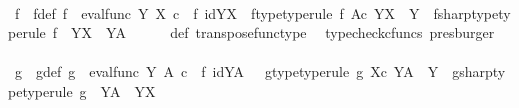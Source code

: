\begin{isabellebody}
\ \ \isamarkupfalse%
\ f\ \ f{\isacharunderscore}{\kern0pt}def{\isacharcolon}{\kern0pt}\ {\isachardoublequoteopen}f\ {\isacharequal}{\kern0pt}\ {\isacharparenleft}{\kern0pt}eval{\isacharunderscore}{\kern0pt}func\ Y\ X{\isacharparenright}{\kern0pt}\ {\isasymcirc}\isactrlsub c\ {\isacharparenleft}{\kern0pt}{\isasympsi}\ {\isasymtimes}\isactrlsub f\ id{\isacharparenleft}{\kern0pt}Y\isactrlbsup X\isactrlesup {\isacharparenright}{\kern0pt}{\isacharparenright}{\kern0pt}{\isachardoublequoteclose}\ \ f{\isacharunderscore}{\kern0pt}type{\isacharbrackleft}{\kern0pt}type{\isacharunderscore}{\kern0pt}rule{\isacharbrackright}{\kern0pt}{\isacharcolon}{\kern0pt}\ {\isachardoublequoteopen}f{\isacharcolon}{\kern0pt}\ A{\isasymtimes}\isactrlsub c\ {\isacharparenleft}{\kern0pt}Y\isactrlbsup X\isactrlesup {\isacharparenright}{\kern0pt}\ {\isasymrightarrow}\ Y{\isachardoublequoteclose}\ \ fsharp{\isacharunderscore}{\kern0pt}type{\isacharbrackleft}{\kern0pt}type{\isacharunderscore}{\kern0pt}rule{\isacharbrackright}{\kern0pt}{\isacharcolon}{\kern0pt}\ {\isachardoublequoteopen}f\isactrlsup {\isasymsharp}\ {\isacharcolon}{\kern0pt}\ Y\isactrlbsup X\isactrlesup \ {\isasymrightarrow}\ Y\isactrlbsup A\isactrlesup {\isachardoublequoteclose}\isanewline
\ \ \ \ \isamarkupfalse%
\ {\isasympsi}{\isacharunderscore}{\kern0pt}def\ transpose{\isacharunderscore}{\kern0pt}func{\isacharunderscore}{\kern0pt}type\ \isamarkupfalse%
\ {\isacharparenleft}{\kern0pt}typecheck{\isacharunderscore}{\kern0pt}cfuncs{\isacharcomma}{\kern0pt}\ presburger{\isacharparenright}{\kern0pt}\isanewline
\ \ \isamarkupfalse%
\ g\ \ g{\isacharunderscore}{\kern0pt}def{\isacharcolon}{\kern0pt}\ {\isachardoublequoteopen}g\ {\isacharequal}{\kern0pt}\ {\isacharparenleft}{\kern0pt}eval{\isacharunderscore}{\kern0pt}func\ Y\ A{\isacharparenright}{\kern0pt}\ {\isasymcirc}\isactrlsub c\ {\isacharparenleft}{\kern0pt}{\isasymphi}\ {\isasymtimes}\isactrlsub f\ id{\isacharparenleft}{\kern0pt}Y\isactrlbsup A\isactrlesup {\isacharparenright}{\kern0pt}{\isacharparenright}{\kern0pt}{\isachardoublequoteclose}\ \ \ g{\isacharunderscore}{\kern0pt}type{\isacharbrackleft}{\kern0pt}type{\isacharunderscore}{\kern0pt}rule{\isacharbrackright}{\kern0pt}{\isacharcolon}{\kern0pt}\ {\isachardoublequoteopen}g{\isacharcolon}{\kern0pt}\ X{\isasymtimes}\isactrlsub c\ {\isacharparenleft}{\kern0pt}Y\isactrlbsup A\isactrlesup {\isacharparenright}{\kern0pt}\ {\isasymrightarrow}\ Y{\isachardoublequoteclose}\ \ gsharp{\isacharunderscore}{\kern0pt}type{\isacharbrackleft}{\kern0pt}type{\isacharunderscore}{\kern0pt}rule{\isacharbrackright}{\kern0pt}{\isacharcolon}{\kern0pt}\ {\isachardoublequoteopen}g\isactrlsup {\isasymsharp}\ {\isacharcolon}{\kern0pt}\ Y\isactrlbsup A\isactrlesup \ {\isasymrightarrow}\ Y\isactrlbsup X\isactrlesup {\isachardoublequoteclose}\isanewline

\end{isabellebody}
